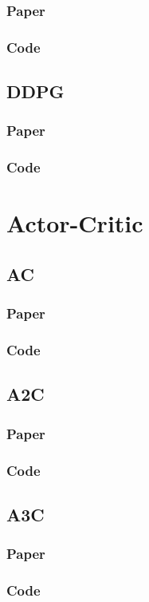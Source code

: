 \documentclass{book}
\begin{document}
\subsection{Paper}
\subsection{Code}
\section{DDPG}
\subsection{Paper}
\subsection{Code}
\chapter{Actor-Critic} 
\section{AC}
\subsection{Paper}
\subsection{Code}
\section{A2C}
\subsection{Paper}
\subsection{Code}
\section{A3C}
\subsection{Paper}
\subsection{Code}
\end{document}
